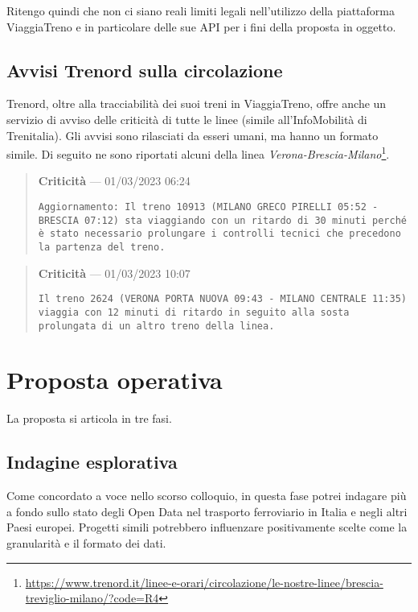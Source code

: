 \documentclass[italian,11pt,a4paper,final]{article}
\begin{document}
	Ritengo quindi che non ci siano reali limiti legali nell'utilizzo della piattaforma ViaggiaTreno e in particolare delle sue API per i fini della proposta in oggetto.

	\subsection{Avvisi Trenord sulla circolazione}

	Trenord, oltre alla tracciabilità dei suoi treni in ViaggiaTreno, offre anche un servizio di avviso delle criticità di tutte le linee (simile all'InfoMobilità di Trenitalia).
	Gli avvisi sono rilasciati da esseri umani, ma hanno un formato simile. Di seguito ne sono riportati alcuni della linea \textit{Verona-Brescia-Milano}\footnote{\url{https://www.trenord.it/linee-e-orari/circolazione/le-nostre-linee/brescia-treviglio-milano/?code=R4}}.

	\begin{quote}
		\textbf{Criticità} --- 01/03/2023 06:24

		\texttt{Aggiornamento:
		Il treno 10913 (MILANO GRECO PIRELLI 05:52 - BRESCIA 07:12) sta viaggiando con un ritardo di 30 minuti perché è stato necessario prolungare i controlli tecnici che precedono la partenza del treno.}
	\end{quote}

	\begin{quote}
		\textbf{Criticità} --- 01/03/2023 10:07\nopagebreak

		\texttt{Il treno 2624 (VERONA PORTA NUOVA 09:43 - MILANO CENTRALE 11:35) viaggia con 12 minuti di ritardo in seguito alla sosta prolungata di un altro treno della linea.}
	\end{quote}

	\section{Proposta operativa}
	La proposta si articola in tre fasi.

	\subsection{Indagine esplorativa}
	Come concordato a voce nello scorso colloquio, in questa fase potrei indagare più a fondo sullo stato degli Open Data nel trasporto ferroviario in Italia e negli altri Paesi europei.
	Progetti simili potrebbero influenzare positivamente scelte come la granularità e il formato dei dati.
\end{document}
